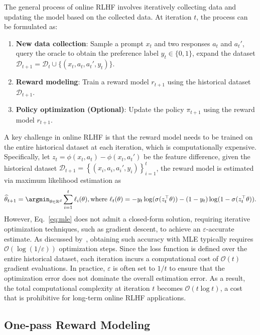 The general process of online RLHF involves iteratively collecting data and updating the model based on the collected data. At iteration $t$, the process can be formulated as:
\begin{enumerate}[label=(\textit{\roman*}), leftmargin=*]
    \item \textbf{New data collection}: Sample a prompt $x_t$ and two responses $a_t$ and $a_t'$, query the oracle to obtain the preference label $y_t \in \{0,1\}$, expand the dataset $\mathcal{D}_{t+1} = \mathcal{D}_t \cup \{(x_t, a_t, a_t', y_t)\}$.
    \item \textbf{Reward modeling}: Train a reward model $r_{t+1}$ using the historical dataset $\mathcal{D}_{t+1}$.
    \item \textbf{Policy optimization (Optional)}: Update the policy $\pi_{t+1}$ using the reward model $r_{t+1}$.
\end{enumerate}
A key challenge in online RLHF is that the reward model needs to be trained on the entire historical dataset at each iteration, which is computationally expensive. Specifically, let $z_t = \phi(x_t, a_t) - \phi(x_t, a_t')$ be the feature difference, given the historical dataset $\mathcal{D}_{t+1}=\left\{(x_i, a_i, a_i', y_i)\right\}_{i=1}^{t}$, the reward model is estimated via maximum likelihood estimation as
\begin{align}
    \label{eq:mle}
      \widehat{\theta}_{t+1}=\argmin_{\theta \in \mathbb{R}^d} \sum_{i=1}^t \ell_i(\theta), \text{where } \ell_t(\theta) =  - y_t \log (\sigma(z_t^\top \theta)) - \left(1-y_t\right) \log(1-\sigma(z_t^\top \theta)).
\end{align}
However, Eq.~\eqref{eq:mle} does not admit a closed-form solution, requiring iterative optimization techniques, such as gradient descent, to achieve an $\varepsilon$-accurate estimate. As discussed by~\citet{AISTATS'22:Faury-Jointly}, obtaining such accuracy with MLE typically requires $\mathcal{O}(\log(1/\varepsilon))$ optimization steps. Since the loss function is defined over the entire historical dataset, each iteration incurs a computational cost of $\mathcal{O}(t)$ gradient evaluations. In practice, $\varepsilon$ is often set to $1/t$ to ensure that the optimization error does not dominate the overall estimation error. As a result, the total computational complexity at iteration $t$ becomes $\mathcal{O}(t \log t)$, a cost that is prohibitive for long-term online RLHF applications.

\subsection{One-pass Reward Modeling}

